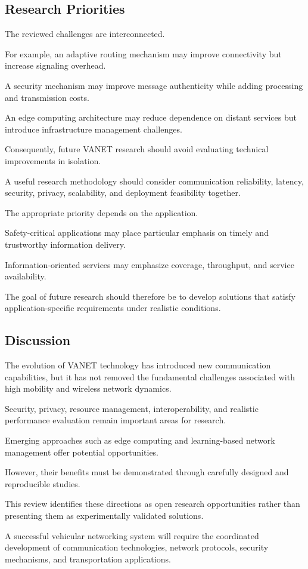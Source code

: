 \subsection{Research Priorities}

The reviewed challenges
are interconnected.

For example, an
adaptive routing
mechanism may improve
connectivity but
increase signaling
overhead.

A security mechanism
may improve message
authenticity while
adding processing
and transmission costs.

An edge computing
architecture may
reduce dependence
on distant services
but introduce
infrastructure
management challenges.

Consequently, future
VANET research should
avoid evaluating
technical improvements
in isolation.

A useful research
methodology should
consider communication
reliability, latency,
security, privacy,
scalability, and
deployment feasibility
together.

The appropriate
priority depends
on the application.

Safety-critical
applications may
place particular
emphasis on timely
and trustworthy
information delivery.

Information-oriented
services may emphasize
coverage, throughput,
and service availability.

The goal of future
research should
therefore be to
develop solutions
that satisfy
application-specific
requirements under
realistic conditions.

\subsection{Discussion}

The evolution of
VANET technology
has introduced
new communication
capabilities, but
it has not removed
the fundamental
challenges associated
with high mobility
and wireless
network dynamics.

Security, privacy,
resource management,
interoperability,
and realistic
performance evaluation
remain important
areas for research.

Emerging approaches
such as edge computing
and learning-based
network management
offer potential
opportunities.

However, their
benefits must be
demonstrated through
carefully designed
and reproducible
studies.

This review identifies
these directions
as open research
opportunities rather
than presenting
them as experimentally
validated solutions.

A successful
vehicular networking
system will require
the coordinated
development of
communication
technologies,
network protocols,
security mechanisms,
and transportation
applications.
